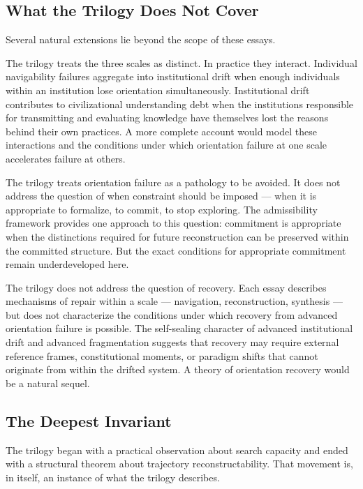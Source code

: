 \subsection*{What the Trilogy Does Not Cover}

Several natural extensions lie beyond the scope of these essays.

The trilogy treats the three scales as distinct. In practice they interact.
Individual navigability failures aggregate into institutional drift when
enough individuals within an institution lose orientation simultaneously.
Institutional drift contributes to civilizational understanding debt when
the institutions responsible for transmitting and evaluating knowledge have
themselves lost the reasons behind their own practices. A more complete
account would model these interactions and the conditions under which
orientation failure at one scale accelerates failure at others.

The trilogy treats orientation failure as a pathology to be avoided. It does
not address the question of when constraint should be imposed --- when it is
appropriate to formalize, to commit, to stop exploring. The admissibility
framework provides one approach to this question: commitment is appropriate
when the distinctions required for future reconstruction can be preserved
within the committed structure. But the exact conditions for appropriate
commitment remain underdeveloped here.

The trilogy does not address the question of recovery. Each essay describes
mechanisms of repair within a scale --- navigation, reconstruction, synthesis
--- but does not characterize the conditions under which recovery from advanced
orientation failure is possible. The self-sealing character of advanced
institutional drift and advanced fragmentation suggests that recovery may
require external reference frames, constitutional moments, or paradigm shifts
that cannot originate from within the drifted system. A theory of orientation
recovery would be a natural sequel.

\subsection*{The Deepest Invariant}

The trilogy began with a practical observation about search capacity and
ended with a structural theorem about trajectory reconstructability. That
movement is, in itself, an instance of what the trilogy describes.

